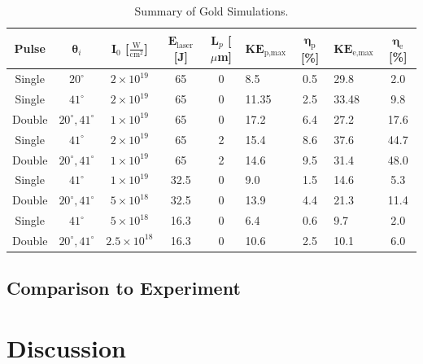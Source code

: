 \renewcommand{\arraystretch}{1.15}
\setlength{\tabcolsep}{0.5em}
\begin{table}
	\centering
	\begin{tabular}{|c|c|c|c|c|p{1.4cm}|c|p{1.4cm}|c|}
		\hline
		\hline
		\textbf{Pulse} & $\pmb{\theta}_i$ & $\mathbf{I}_0$ [$\frac{\text{W}}{\text{cm}^2}$]  & $\mathbf{E}_\text{laser}$ [J] & $\mathbf{L}_p$ [$\mu$m] & $\mathbf{KE}_\text{p,max}$\newline [MeV] & $\pmb{\eta}_\text{p}$ [\%] & $\mathbf{KE}_\text{e,max}$\newline [MeV]& $\pmb{\eta}_{\text{e}}$ [\%] \\
		\hline 
		Single & $20^\circ$ & $2 \times 10^{19}$ & 65 & 0 & 8.5 & 0.5 & 29.8 & 2.0 \\
		\hline
		Single & $41^\circ$ & $2 \times 10^{19}$ & 65 & 0 & 11.35 & 2.5 & 33.48 & 9.8 \\
		Double & $20^\circ, 41^\circ$ & $1 \times 10^{19}$ & 65 & 0 & 17.2 & 6.4 & 27.2 & 17.6 \\
		Single & $41^\circ$ & $2 \times 10^{19}$ & 65 & 2 & 15.4 & 8.6 & 37.6 & 44.7 \\
		Double & $20^\circ, 41^\circ$ & $1 \times 10^{19}$ & 65 & 2 & 14.6 & 9.5 & 31.4 & 48.0 \\
		\hline 
		Single & $41^\circ$ & $1 \times 10^{19}$ & 32.5 & 0 & 9.0 & 1.5 & 14.6 & 5.3 \\
		Double & $20^\circ, 41^\circ$ & $5 \times 10^{18}$ & 32.5 & 0 & 13.9 & 4.4 & 21.3 & 11.4 \\
		Single & $41^\circ$ & $5 \times 10^{18}$ & 16.3 & 0 & 6.4 & 0.6 & 9.7 & 2.0 \\
		Double & $20^\circ, 41^\circ$ & $2.5 \times 10^{18}$ & 16.3 & 0 & 10.6 & 2.5 & 10.1 & 6.0 \\
		\hline
		\hline
	\end{tabular}
	\caption{Summary of Gold Simulations.}
	\label{tab:gold_sims}
\end{table}

\subsection{Comparison to Experiment}

\section{Discussion}

